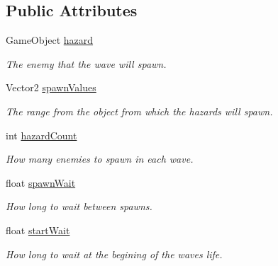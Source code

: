 \subsection*{Public Attributes}
\begin{DoxyCompactItemize}
\item 
\mbox{\label{class_wave_behavior_a6890b5a829fbd0d27517b75ab3e9fa12}} 
Game\+Object \mbox{\hyperlink{class_wave_behavior_a6890b5a829fbd0d27517b75ab3e9fa12}{hazard}}
\begin{DoxyCompactList}\small\item\em The enemy that the wave will spawn. \end{DoxyCompactList}\item 
\mbox{\label{class_wave_behavior_ae26807be7d4406478efc4886aa610189}} 
Vector2 \mbox{\hyperlink{class_wave_behavior_ae26807be7d4406478efc4886aa610189}{spawn\+Values}}
\begin{DoxyCompactList}\small\item\em The range from the object from which the hazards will spawn. \end{DoxyCompactList}\item 
\mbox{\label{class_wave_behavior_a3790e0815c8d88a71e77e3227b050b42}} 
int \mbox{\hyperlink{class_wave_behavior_a3790e0815c8d88a71e77e3227b050b42}{hazard\+Count}}
\begin{DoxyCompactList}\small\item\em How many enemies to spawn in each wave. \end{DoxyCompactList}\item 
\mbox{\label{class_wave_behavior_a401c9221c61cc6b50bc1d538b5365555}} 
float \mbox{\hyperlink{class_wave_behavior_a401c9221c61cc6b50bc1d538b5365555}{spawn\+Wait}}
\begin{DoxyCompactList}\small\item\em How long to wait between spawns. \end{DoxyCompactList}\item 
\mbox{\label{class_wave_behavior_ae8cd1f5cb102b67698fd4043bf2314d2}} 
float \mbox{\hyperlink{class_wave_behavior_ae8cd1f5cb102b67698fd4043bf2314d2}{start\+Wait}}
\begin{DoxyCompactList}\small\item\em How long to wait at the begining of the wave\textquotesingle{}s life. \end{DoxyCompactList}\item 

\end{DoxyCompactItemize}
